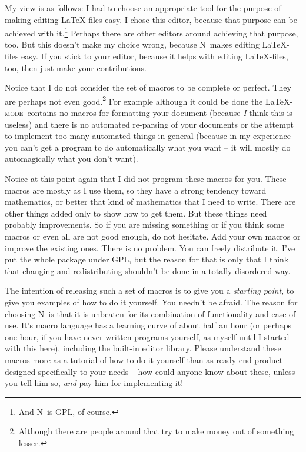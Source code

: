 \documentclass{article}
\newcommand{\latexpack}{\LaTeX-\textsc{mode}}
\newcommand{\nedit}{N\kern-0.8pt{Edit}}
\begin{document}
My view is as follows: I had to choose an appropriate tool for the purpose of making editing \LaTeX-files easy. I chose this editor, because that purpose can be achieved with it.\footnote{And \nedit\ is GPL, of course.} Perhaps there are other editors around achieving that purpose, too. But this doesn't make my choice wrong, because \nedit\ makes editing \LaTeX-files easy. If you stick to your editor, because it helps with editing \LaTeX-files, too, then just make your contributions.

Notice that I do not consider the set of macros to be complete or perfect. They are perhaps not even good.\footnote{Although there are people around that try to make money out of something lesser.} For example although it could be done the \latexpack\ contains no macros for formatting your document (because \emph{I} think this is useless) and there is no automated re-parsing of your documents or the attempt to implement too many automated things in general (because in my experience you can't get a program to do automatically what you want -- it will mostly do automagically what you don't want).
 
Notice at this point again that I did not program these macros for you. These macros are mostly as I use them, so they have a strong tendency toward mathematics, or better that kind of mathematics that I need to write. There are other things added only to show how to get them. But these things need probably improvements. So if you are missing something or if you think some macros or even all are not good enough, do not hesitate. Add your own macros or improve the existing ones. There is no problem. You can freely distribute it. I've put the whole package under GPL, but the reason for that is only that I think that changing and redistributing shouldn't be done in a totally disordered way. 

The intention of releasing such a set of macros is to give you a \emph{starting point}, to give you examples of how to do it yourself. You needn't be afraid. The reason for choosing \nedit\ is that it is unbeaten for its combination of functionality and ease-of-use. It's macro language has a learning curve of about half an hour (or perhaps one hour, if you have never written programs yourself, as myself until I started with this here), including the built-in editor library. Please understand these macros more as a tutorial of how to do it yourself than as ready end product designed specifically to your needs -- how could anyone know about these, unless you tell him so, \emph{and} pay him for implementing it!
\end{document}
